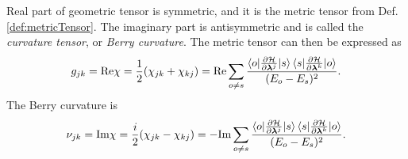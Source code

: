 Real part of geometric tensor is symmetric, and it is the metric tensor from Def. \ref{def:metricTensor}. The imaginary part is antisymmetric and is called the \emph{curvature tensor}, or \emph{Berry curvature}. The metric tensor can then be expressed as
\begin{equation}
    g_{jk} =\text{Re} \chi = \frac{1}{2}(\chi_{jk}+\chi_{kj}) = \text{Re} \sum_{o\neq s}\frac{\braket{o|\frac{\partial \mathcal{H}}{\partial {\bm\lambda}^j}|s}\braket{s|\frac{\partial \mathcal{H}}{\partial {\bm\lambda}^k}|o}}{(E_o-E_s)^2}.
    \label{eq:metrictensorREdefinition}
\end{equation}
The Berry curvature is
\begin{equation}
        \nu_{jk} =\textrm{Im} \chi= \frac{i}{2}(\chi_{jk}-\chi_{kj})=  - \textrm{Im} \sum_{o\neq s}\frac{\braket{o|\frac{\partial \mathcal{H}}{\partial {\bm\lambda}^j}|s}\braket{s|\frac{\partial \mathcal{H}}{\partial {\bm\lambda}^k}|o}}{(E_o-E_s)^2}.
    \label{eq:geom.tensorREdefinition}
\end{equation}




